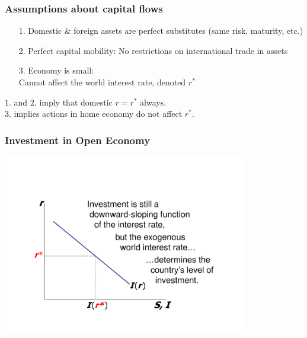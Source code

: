 \documentclass[handout]{beamer}
\begin{document}

\begin{frame}[t]
\frametitle{Assumptions about capital flows}
\begin{itemize}
\item[1.] Domestic \& foreign assets are perfect substitutes (same risk, maturity, etc.)

\item[2.]  Perfect capital mobility: No restrictions on international trade in assets

\item[3.]  Economy is small: \\
Cannot affect the world interest rate, denoted $r^*$
\end{itemize}
\bigskip
$1.$ and $2.$ imply that domestic $r = r^*$ always.\\
\bigskip
$3.$ implies actions in home economy do not affect $r^*$.
\end{frame}


\begin{frame}[t]
\frametitle{Investment in Open Economy}
\begin{center}
\includegraphics[height=3.1in,width=4.25in]{ch6_investment_curve.pdf}
\end{center}
\end{frame}

\end{document}
